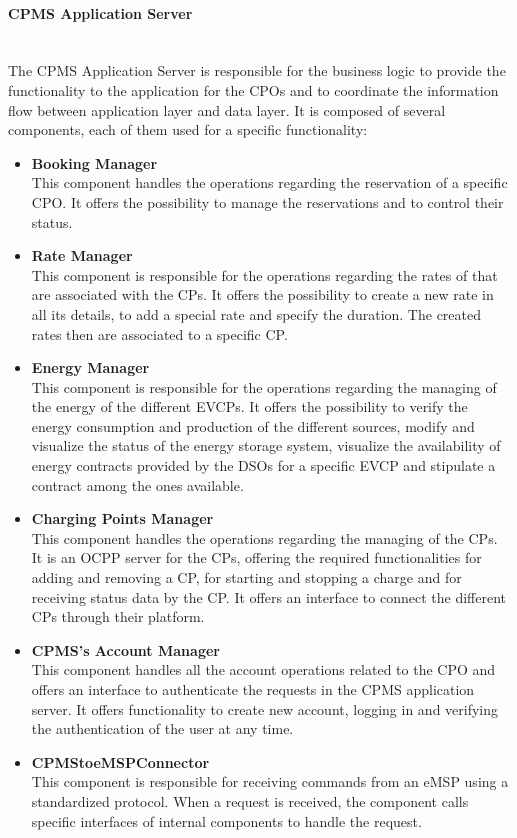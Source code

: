 \paragraph*{CPMS Application Server} \hfill \\
The CPMS Application Server is responsible for the business logic to provide the functionality to the application for the CPOs and to coordinate the information flow between application layer and data layer.
It is composed of several components, each of them used for a specific functionality:\\
\begin{itemize}
    \item \textbf{Booking Manager} \\
          This component handles the operations regarding the reservation of a specific CPO. It offers the possibility to manage the reservations and to control their status.
    \item \textbf{Rate Manager} \\ This component is responsible for the operations regarding the rates of that are associated with the CPs. It offers the possibility to
          create a new rate in all its details, to add a special rate and specify the duration. The created rates then are associated to a specific CP.
    \item \textbf{Energy Manager} \\ This component is responsible for the operations regarding the managing of the energy of the different EVCPs.
          It offers the possibility to verify the energy consumption and production of the different sources, modify and visualize the status of the energy storage system,
          visualize the availability of energy contracts provided by the DSOs for a specific EVCP and stipulate a contract among the ones available.
    \item \textbf{Charging Points Manager} \\ This component handles the operations regarding the managing of the CPs. It is an OCPP server for the CPs, offering the
          required functionalities for adding and removing a CP, for starting and stopping a charge and for receiving status data by the CP. It offers an interface to connect the different CPs through their platform.
    \item \textbf{CPMS's Account Manager} \\ This component handles all the account operations related to the CPO and offers an interface to authenticate the requests in the CPMS application server.
          It offers functionality to create new account, logging in and verifying the authentication of the user at any time.
    \item \textbf{CPMStoeMSPConnector} \\ This component is responsible for receiving commands from an eMSP using a standardized protocol. When a request is received, the component calls specific interfaces of internal components to handle the request.
\end{itemize}

